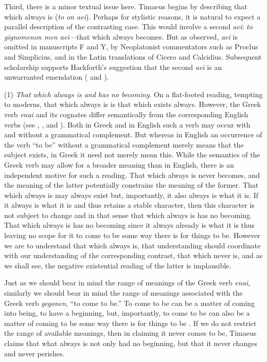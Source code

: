 Third, there is a minor textual issue here. Timaeus begins by describing that which always is (\emph{to on aei}). Perhaps for stylistic reasons, it is natural to expect a parallel description of the contrasting case. This would involve a second \emph{aei}: \emph{to gignomenon men aei}---that which always becomes. But as \citet{Hackforth:1959dj} observed, \emph{aei} is omitted in manuscripts F and Y, by Neoplatonist commentators such as Proclus and Simplicius, and in the Latin translations of Cicero and Calcidius. Subsequent scholarship supports Hackforth's suggestion that the second \emph{aei} is an unwarranted emendation (\citealt{Whittaker:1969mq,Whittaker:1973nz} and \citealt{Dillon:1989hc}). 

(1) \emph{That which always is and has no becoming}. On a flat-footed reading, tempting to moderns, that which always is is that which exists always. However, the Greek verb \emph{enai} and its cognates differ semantically from the corresponding English verbs (see \citealt{Kahn:2009kx}, \citealt{Brown:1994aa}, and \citealt{Leigh:2008aa}). Both in Greek and in English such a verb may occur with and without a grammatical complement. But whereas in English an occurrence of the verb ``to be'' without a grammatical complement merely means that the subject exists, in Greek it need not merely mean this. While the semantics of the Greek verb may allow for a broader meaning than in English, there is an independent motive for such a reading. That which always is never becomes, and the meaning of the latter potentially constrains the meaning of the former. That which always is may always exist but, importantly, it also always is what it is. If it always is what it is and thus retains a stable character, then this character is not subject to change and in that sense that which always is has no becoming. That which always is has no becoming since it always already is what it is thus leaving no scope for it to come to be some way there is for things to be. However we are to understand that which always is, that understanding should coordinate with our understanding of the corresponding contrast, that which never is, and as we shall see, the negative existential reading of the latter is implausible.

Just as we should bear in mind the range of meanings of the Greek verb \emph{enai}, similarly we should bear in mind the range of meanings associated with the Greek verb \emph{gegonen}, ``to come to be.'' To come to be can be a matter of coming into being, to have a beginning, but, importantly, to come to be can also be a matter of coming to be some way there is for things to be \citep[24--5]{Cornford:1935fk}. If we do not restrict the range of available meanings, then in claiming it never comes to be, Timaeus claims that what always is not only had no beginning, but that it never changes and never perishes.

